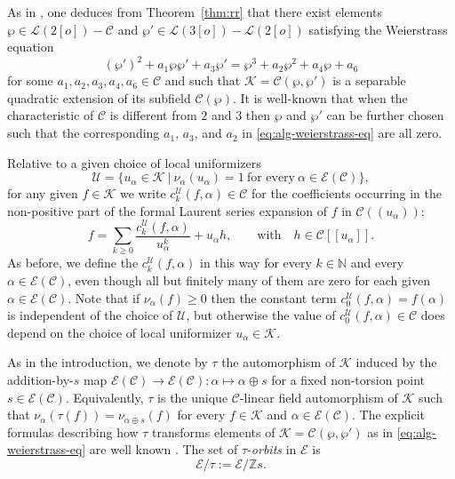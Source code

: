 \documentclass[preprint,12pt]{elsarticle}
\numberwithin{equation}{section} %
\theoremstyle{theorem}
\theoremstyle{definition}
\newcommand{\Ca}{\mathcal{C}} %
\newcommand{\bk}{\mathcal{K}} %
\newcommand{\ec}{\mathcal{E}} %
\newcommand{\idec}{{o}} %
\newcommand{\orbita}{{\ec/\tau}} %
\newcommand{\Z}{\mathbb{Z}} %
\begin{document}
As in \cite[Prop.~III.3.1]{SilvermanIntro}, one deduces from Theorem~\ref{thm:rr} that there exist elements $\wp\in\mathcal{L}(2[\idec])-\Ca$ and $\wp'\in\mathcal{L}(3[\idec])-\mathcal{L}(2[\idec])$ satisfying the Weierstrass equation \begin{equation}\label{eq:alg-weierstrass-eq}(\wp')^2+a_1\wp\wp'+a_3\wp'=\wp^3+a_2\wp^2+a_4\wp+a_6\end{equation} for some $a_1,a_2,a_3,a_4,a_6\in\Ca$ and such that $\bk=\Ca(\wp,\wp')$ is a separable quadratic extension of its subfield $\Ca(\wp)$. It is well-known that when the characteristic of $\Ca$ is different from $2$ and $3$ then $\wp$ and $\wp'$ can be further chosen such that the corresponding $a_1$, $a_3$, and $a_2$ in \eqref{eq:alg-weierstrass-eq} are all zero.

Relative to a given choice of local uniformizers \begin{equation}\label{eq:uniformizers}\mathcal{U}=\bigl\{u_\alpha \in\bk \ \big| \ \nu_\alpha(u_\alpha)=1 \ \text{for every} \ \alpha\in\ec(\Ca)\bigr\},\end{equation} for any given $f\in\bk$ we write $c_k^\mathcal{U}(f,\alpha)\in\Ca$ for the coefficients occurring in the non-positive part of the formal Laurent series expansion of $f$ in $\Ca((u_\alpha))$:
\begin{equation}\label{eq:laurent-coeffs-a}f=\sum_{k\geq 0}\frac{c_k^\mathcal{U}(f,\alpha)}{u_\alpha^k}+u_\alpha h,\qquad\text{with} \quad h\in\Ca[[u_\alpha]].\end{equation} As before, we define the $c_k^\mathcal{U}(f,\alpha)$ in this way for every $k\in\mathbb{N}$ and every $\alpha\in\ec(\Ca)$, even though all but finitely many of them are zero for each given $\alpha\in\ec(\Ca)$. Note that if $\nu_\alpha(f)\geq 0$ then the constant term $c_0^\mathcal{U}(f,\alpha)=f(\alpha)$ is independent of the choice of $\mathcal{U}$, but otherwise the value of $c_0^\mathcal{U}(f,\alpha)\in\Ca$ does depend on the choice of local uniformizer $u_\alpha\in\bk$.

As in the introduction, we denote by $\tau$ the automorphism of $\bk$ induced by the addition-by-$s$ map $\ec(\Ca)\rightarrow \ec(\Ca):\alpha\mapsto \alpha\oplus s$ for a fixed non-torsion point $s\in\ec(\Ca)$. Equivalently, $\tau$ is the unique $\Ca$-linear field automorphism of $\bk$ such that $\nu_{\alpha}(\tau(f))=\nu_{\alpha\oplus s}(f)$ for every $f\in\bk$ and $\alpha\in\ec(\Ca)$. The explicit formulas describing how $\tau$ transforms elements of $\bk=\Ca(\wp,\wp')$ as in \eqref{eq:alg-weierstrass-eq} are well known \cite[\S III.2]{SilvermanIntro}. The set of $\tau$-\emph{orbits} in $\ec$ is \[\orbita:=\ec/\Z s.\]
\end{document}
